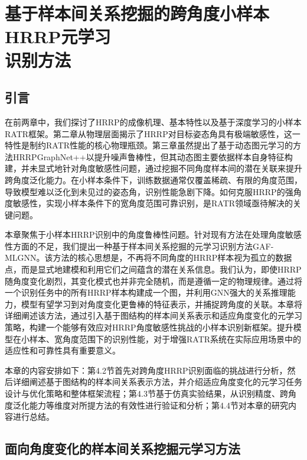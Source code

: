 \chapter[基于样本间关系挖掘的跨角度小样本HRRP元学习识别方法]{基于样本间关系挖掘的跨角度小样本HRRP元学习\protect\\ 识别方法}
\label{chap:angle_robust}

\section{引言}
\label{sec:angle_intro}

在前两章中，我们探讨了HRRP的成像机理、基本特性以及基于深度学习的小样本RATR框架。第二章从物理层面揭示了HRRP对目标姿态角具有极端敏感性，这一特性是制约RATR性能的核心物理瓶颈。第三章虽然提出了基于动态图元学习的方法HRRPGraphNet++以提升噪声鲁棒性，但其动态图主要依据样本自身特征构建，并未显式地针对角度敏感性问题，通过挖掘不同角度样本间的潜在关联来提升跨角度泛化能力。在小样本条件下，训练数据通常仅覆盖稀疏、有限的角度范围，导致模型难以泛化到未见过的姿态角，识别性能急剧下降。如何克服HRRP的强角度敏感性，实现小样本条件下的宽角度范围可靠识别，是RATR领域亟待解决的关键问题。

本章聚焦于小样本HRRP识别中的角度鲁棒性问题。针对现有方法在处理角度敏感性方面的不足，我们提出一种基于样本间关系挖掘的元学习识别方法GAF-MLGNN。该方法的核心思想是，不再将不同角度的HRRP样本视为孤立的数据点，而是显式地建模和利用它们之间蕴含的潜在关系信息。我们认为，即使HRRP随角度变化剧烈，其变化模式也并非完全随机，而是遵循一定的物理规律。通过将一个识别任务中的所有HRRP样本构建成一个图，并利用GNN强大的关系推理能力，模型有望学习到对角度变化更鲁棒的特征表示，并捕捉跨角度的关联。本章将详细阐述该方法，通过引入基于图结构的样本间关系表示和适应角度变化的元学习策略，构建一个能够有效应对HRRP角度敏感性挑战的小样本识别新框架。提升模型在小样本、宽角度范围下的识别性能，对于增强RATR系统在实际应用场景中的适应性和可靠性具有重要意义。

本章的内容安排如下：第4.2节首先对跨角度HRRP识别面临的挑战进行分析，然后详细阐述基于图结构的样本间关系表示方法，并介绍适应角度变化的元学习任务设计与优化策略和整体框架流程；第4.3节基于仿真实验结果，从识别精度、跨角度泛化能力等维度对所提方法的有效性进行验证和分析；第4.4节对本章的研究内容进行总结。

\section{面向角度变化的样本间关系挖掘元学习方法}
\label{sec:angle_method}

